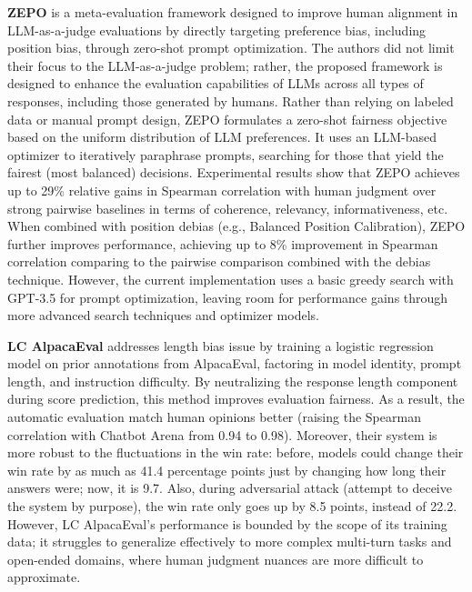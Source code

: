 \documentclass[sigconf, authoryear]{acmart}
\begin{document}
\textbf{ZEPO} is a meta-evaluation framework designed to improve human alignment in LLM-as-a-judge evaluations by directly targeting preference bias, including position bias, through zero-shot prompt optimization.
The authors did not limit their focus to the LLM-as-a-judge problem; rather, the proposed framework is designed to enhance the evaluation capabilities of LLMs across all types of responses, including those generated by humans.
Rather than relying on labeled data or manual prompt design, ZEPO formulates a zero-shot fairness objective based on the uniform distribution of LLM preferences.
It uses an LLM-based optimizer to iteratively paraphrase prompts, searching for those that yield the fairest (most balanced) decisions.
Experimental results show that ZEPO achieves up to 29\% relative gains in Spearman correlation with human judgment over strong pairwise baselines in terms of coherence, relevancy, informativeness, etc.
When combined with position debias (e.g., Balanced Position Calibration\cite{wang2023largelanguagemodelsfair}), ZEPO further improves performance, achieving up to 8\% improvement in Spearman correlation comparing to the pairwise comparison combined with the debias technique.
However, the current implementation uses a basic greedy search with GPT-3.5 for prompt optimization, leaving room for performance gains through more advanced search techniques and optimizer models\cite{zhou2024zepo}.

\textbf{LC AlpacaEval} addresses length bias issue by training a logistic regression model on prior annotations from AlpacaEval, factoring in model identity, prompt length, and instruction difficulty.
By neutralizing the response length component during score prediction, this method improves evaluation fairness.
As a result, the automatic evaluation match human opinions better (raising the Spearman correlation with Chatbot Arena from 0.94 to 0.98).
Moreover, their system is more robust to the fluctuations in the win rate: before, models could change their win rate by as much as 41.4 percentage points just by changing how long their answers were; now, it is 9.7.
Also, during adversarial attack (attempt to deceive the system by purpose), the win rate only goes up by 8.5 points, instead of 22.2.
However, LC AlpacaEval's performance is bounded by the scope of its training data; it struggles to generalize effectively to more complex multi-turn tasks and open-ended domains, where human judgment nuances are more difficult to approximate\cite{lc_alpacha}.
\end{document}
